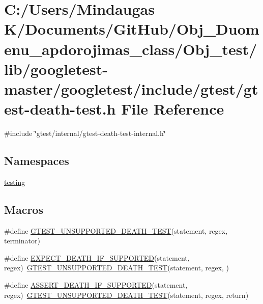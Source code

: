 \hypertarget{_obj__test_2lib_2googletest-master_2googletest_2include_2gtest_2gtest-death-test_8h}{}\section{C\+:/\+Users/\+Mindaugas K/\+Documents/\+Git\+Hub/\+Obj\+\_\+\+Duomenu\+\_\+apdorojimas\+\_\+class/\+Obj\+\_\+test/lib/googletest-\/master/googletest/include/gtest/gtest-\/death-\/test.h File Reference}
\label{_obj__test_2lib_2googletest-master_2googletest_2include_2gtest_2gtest-death-test_8h}
{\ttfamily \#include \char`\"{}gtest/internal/gtest-\/death-\/test-\/internal.\+h\char`\"{}}\newline
\subsection*{Namespaces}
\begin{DoxyCompactItemize}
\item 
 \mbox{\hyperlink{namespacetesting}{testing}}
\end{DoxyCompactItemize}
\subsection*{Macros}
\begin{DoxyCompactItemize}
\item 
\#define \mbox{\hyperlink{_obj__test_2lib_2googletest-master_2googletest_2include_2gtest_2gtest-death-test_8h_aa5f42ab29859b7f49a901770d2e66855}{G\+T\+E\+S\+T\+\_\+\+U\+N\+S\+U\+P\+P\+O\+R\+T\+E\+D\+\_\+\+D\+E\+A\+T\+H\+\_\+\+T\+E\+ST}}(statement,  regex,  terminator)
\item 
\#define \mbox{\hyperlink{_obj__test_2lib_2googletest-master_2googletest_2include_2gtest_2gtest-death-test_8h_a8564de0e012dd0898949c513d1571f8b}{E\+X\+P\+E\+C\+T\+\_\+\+D\+E\+A\+T\+H\+\_\+\+I\+F\+\_\+\+S\+U\+P\+P\+O\+R\+T\+ED}}(statement,  regex)~\mbox{\hyperlink{_obj__test_2lib_2googletest-release-1_88_81_2googletest_2include_2gtest_2gtest-death-test_8h_aa5f42ab29859b7f49a901770d2e66855}{G\+T\+E\+S\+T\+\_\+\+U\+N\+S\+U\+P\+P\+O\+R\+T\+E\+D\+\_\+\+D\+E\+A\+T\+H\+\_\+\+T\+E\+ST}}(statement, regex, )
\item 
\#define \mbox{\hyperlink{_obj__test_2lib_2googletest-master_2googletest_2include_2gtest_2gtest-death-test_8h_ab2f0f25b46353767179a49ebd15b7345}{A\+S\+S\+E\+R\+T\+\_\+\+D\+E\+A\+T\+H\+\_\+\+I\+F\+\_\+\+S\+U\+P\+P\+O\+R\+T\+ED}}(statement,  regex)~\mbox{\hyperlink{_obj__test_2lib_2googletest-release-1_88_81_2googletest_2include_2gtest_2gtest-death-test_8h_aa5f42ab29859b7f49a901770d2e66855}{G\+T\+E\+S\+T\+\_\+\+U\+N\+S\+U\+P\+P\+O\+R\+T\+E\+D\+\_\+\+D\+E\+A\+T\+H\+\_\+\+T\+E\+ST}}(statement, regex, return)
\end{DoxyCompactItemize}
